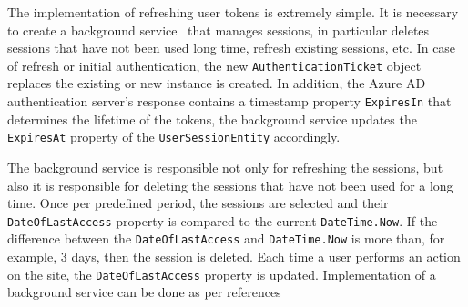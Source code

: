 The implementation of refreshing user tokens is extremely simple.
It is necessary to create a background service~\cite{microsoftHostedservice2023} that manages sessions,
in particular deletes sessions that have not been used long time, refresh existing sessions, etc.
In case of refresh or initial authentication, the new \texttt{AuthenticationTicket} object~\cite{microsoftAuthenticationTicket2023}
replaces the existing or new instance is created.
In addition, the Azure AD authentication server's response contains a timestamp property \texttt{ExpiresIn}
that determines the lifetime of the tokens,
the background service updates the \texttt{ExpiresAt} property of the \texttt{UserSessionEntity} accordingly.

The background service is responsible not only for refreshing the sessions,
but also it is responsible for deleting the sessions that have not been used for a long time.
Once per predefined period, the sessions are selected and their \texttt{DateOfLastAccess} property is
compared to the current \texttt{DateTime.Now}.
If the difference between the \texttt{DateOfLastAccess} and \texttt{DateTime.Now} is more than, for example, 3 days,
 then the session is deleted.
Each time a user performs an action on the site, the \texttt{DateOfLastAccess} property is updated.
Implementation of a background service can be done as per references~\cite{backroundService_2023, configurationBackgroundService_2023}